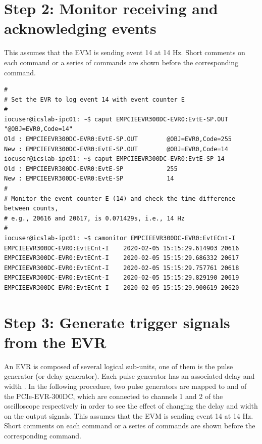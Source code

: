 \documentclass[11pt
  , a4paper
  , article
  , oneside
  , showtrims
]{memoir}
\begin{document}
{\section{Step 2: Monitor receiving and acknowledging events}
This assumes that the EVM is sending event 14 at 14 Hz. Short comments on each command or a series of commands are shown before the corresponding command.
\begin{lstlisting}[style=termstylenumber]
#
# Set the EVR to log event 14 with event counter E
#
iocuser@icslab-ipc01: ~$ caput EMPCIEEVR300DC-EVR0:EvtE-SP.OUT "@OBJ=EVR0,Code=14"
Old : EMPCIEEVR300DC-EVR0:EvtE-SP.OUT        @OBJ=EVR0,Code=255
New : EMPCIEEVR300DC-EVR0:EvtE-SP.OUT        @OBJ=EVR0,Code=14
iocuser@icslab-ipc01: ~$ caput EMPCIEEVR300DC-EVR0:EvtE-SP 14
Old : EMPCIEEVR300DC-EVR0:EvtE-SP            255
New : EMPCIEEVR300DC-EVR0:EvtE-SP            14
#
# Monitor the event counter E (14) and check the time difference between counts,
# e.g., 20616 and 20617, is 0.071429s, i.e., 14 Hz
#
iocuser@icslab-ipc01: ~$ camonitor EMPCIEEVR300DC-EVR0:EvtECnt-I
EMPCIEEVR300DC-EVR0:EvtECnt-I    2020-02-05 15:15:29.614903 20616
EMPCIEEVR300DC-EVR0:EvtECnt-I    2020-02-05 15:15:29.686332 20617
EMPCIEEVR300DC-EVR0:EvtECnt-I    2020-02-05 15:15:29.757761 20618
EMPCIEEVR300DC-EVR0:EvtECnt-I    2020-02-05 15:15:29.829190 20619
EMPCIEEVR300DC-EVR0:EvtECnt-I    2020-02-05 15:15:29.900619 20620
\end{lstlisting}


\section{Step 3: Generate trigger signals from the EVR}
An EVR is composed of several logical sub-units, one of them is the pulse generator (or delay generator). Each pulse generator has an associated delay and width \cite{EVR-USER-GUIDE}. In the following procedure, two pulse generators are mapped to  and  of the PCIe-EVR-300DC, which are connected to channels 1 and 2 of the oscilloscope respectively in order to see the effect of changing the delay and width on the output signals. This assumes that the EVM is sending event 14 at 14 Hz. Short comments on each command or a series of commands are shown before the corresponding command.\\

}
\end{document}
